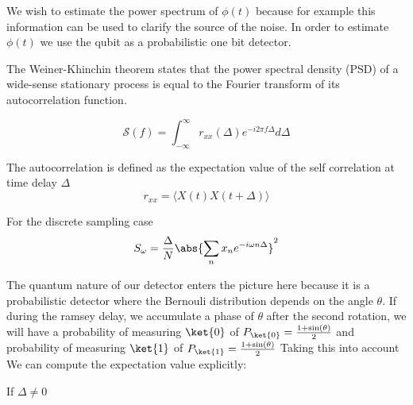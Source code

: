 We wish to estimate the power spectrum of $\phi (t)$ because for example this information can be used to clarify the source of the noise.
In order to estimate $\phi (t)$ we use the qubit as a probabilistic one bit detector.

The Weiner-Khinchin theorem states that the power spectral density (PSD)
of a wide-sense stationary process is equal to the Fourier transform of its autocorrelation function.

\begin{equation}
    \mathcal{S}(f) = \int_{-\infty}^{\infty} r_{xx} (\Delta) e^{- i 2 \pi f \Delta} d\Delta
\end{equation}

The autocorrelation is defined as the expectation value of the self correlation at time delay $\Delta$
\begin{equation}
    r_{xx} = \langle X(t) X(t+\Delta) \rangle
\end{equation}

For the discrete sampling case 
\begin{equation}
    S_{\omega} = \frac{\Delta}{N} \abs{\sum_n x_n e^{- i \omega n \Delta}}^2
\end{equation}

The quantum nature of our detector enters the picture here because it is a probabilistic detector where the Bernouli distribution depends on the angle $\theta$.
If during the ramsey delay, we accumulate a phase of $\theta$ after the second rotation, we will have
a probability of measuring $\ket{0}$ of $P_{\ket{0}} = \frac{1 + \sin (\theta)}{2}$
and probability of measuring $\ket{1}$ of $P_{\ket{1}} = \frac{1 + \sin (\theta)}{2}$
Taking this into account We can compute the expectation value explicitly:

If $\Delta \neq 0$



